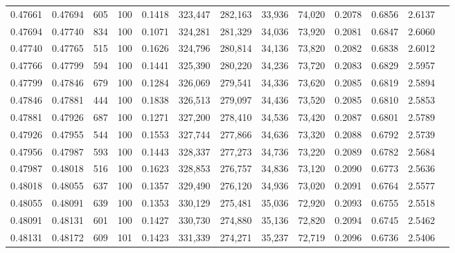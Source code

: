 \begin{tabular}{rrrrrrrrrrrrr}
0.47661 & 0.47694 &   605 & 100 &                                     0.1418 & 323,447 & 282,163 &  33,936 &  74,020 & 0.2078 & 0.6856 & 2.6137 \\
0.47694 & 0.47740 &   834 & 100 &                                     0.1071 & 324,281 & 281,329 &  34,036 &  73,920 & 0.2081 & 0.6847 & 2.6060 \\
0.47740 & 0.47765 &   515 & 100 &                                     0.1626 & 324,796 & 280,814 &  34,136 &  73,820 & 0.2082 & 0.6838 & 2.6012 \\
0.47766 & 0.47799 &   594 & 100 &                                     0.1441 & 325,390 & 280,220 &  34,236 &  73,720 & 0.2083 & 0.6829 & 2.5957 \\
0.47799 & 0.47846 &   679 & 100 &                                     0.1284 & 326,069 & 279,541 &  34,336 &  73,620 & 0.2085 & 0.6819 & 2.5894 \\
0.47846 & 0.47881 &   444 & 100 &                                     0.1838 & 326,513 & 279,097 &  34,436 &  73,520 & 0.2085 & 0.6810 & 2.5853 \\
0.47881 & 0.47926 &   687 & 100 &                                     0.1271 & 327,200 & 278,410 &  34,536 &  73,420 & 0.2087 & 0.6801 & 2.5789 \\
0.47926 & 0.47955 &   544 & 100 &                                     0.1553 & 327,744 & 277,866 &  34,636 &  73,320 & 0.2088 & 0.6792 & 2.5739 \\
0.47956 & 0.47987 &   593 & 100 &                                     0.1443 & 328,337 & 277,273 &  34,736 &  73,220 & 0.2089 & 0.6782 & 2.5684 \\
0.47987 & 0.48018 &   516 & 100 &                                     0.1623 & 328,853 & 276,757 &  34,836 &  73,120 & 0.2090 & 0.6773 & 2.5636 \\
0.48018 & 0.48055 &   637 & 100 &                                     0.1357 & 329,490 & 276,120 &  34,936 &  73,020 & 0.2091 & 0.6764 & 2.5577 \\
0.48055 & 0.48091 &   639 & 100 &                                     0.1353 & 330,129 & 275,481 &  35,036 &  72,920 & 0.2093 & 0.6755 & 2.5518 \\
0.48091 & 0.48131 &   601 & 100 &                                     0.1427 & 330,730 & 274,880 &  35,136 &  72,820 & 0.2094 & 0.6745 & 2.5462 \\
0.48131 & 0.48172 &   609 & 101 &                                     0.1423 & 331,339 & 274,271 &  35,237 &  72,719 & 0.2096 & 0.6736 & 2.5406 \\

\end{tabular}
